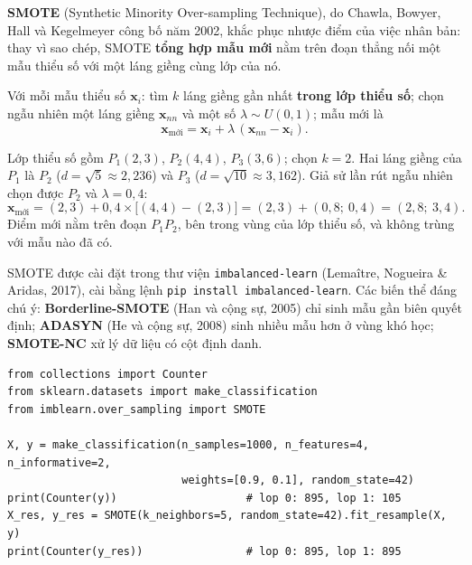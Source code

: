 \textbf{SMOTE} (Synthetic Minority Over-sampling Technique), do Chawla, Bowyer, Hall và Kegelmeyer công bố năm 2002, khắc phục nhược điểm của việc nhân bản: thay vì sao chép, SMOTE \textbf{tổng hợp mẫu mới} nằm trên đoạn thẳng nối một mẫu thiểu số với một láng giềng cùng lớp của nó.

\begin{definition}
Với mỗi mẫu thiểu số $\mathbf{x}_i$: tìm $k$ láng giềng gần nhất \textbf{trong lớp thiểu số}; chọn ngẫu nhiên một láng giềng $\mathbf{x}_{nn}$ và một số $\lambda \sim U(0, 1)$; mẫu mới là
\begin{equation}
    \mathbf{x}_{\text{mới}} = \mathbf{x}_i + \lambda\,(\mathbf{x}_{nn} - \mathbf{x}_i).
\end{equation}
\end{definition}

\begin{example}
Lớp thiểu số gồm $P_1(2, 3)$, $P_2(4, 4)$, $P_3(3, 6)$; chọn $k = 2$. Hai láng giềng của $P_1$ là $P_2$ ($d = \sqrt{5} \approx 2{,}236$) và $P_3$ ($d = \sqrt{10} \approx 3{,}162$). Giả sử lần rút ngẫu nhiên chọn được $P_2$ và $\lambda = 0{,}4$:
\[
    \mathbf{x}_{\text{mới}} = (2, 3) + 0{,}4 \times \big[(4, 4) - (2, 3)\big] = (2, 3) + (0{,}8;\ 0{,}4) = (2{,}8;\ 3{,}4).
\]
Điểm mới nằm trên đoạn $P_1P_2$, bên trong vùng của lớp thiểu số, và không trùng với mẫu nào đã có.
\end{example}


SMOTE được cài đặt trong thư viện \texttt{imbalanced-learn} (Lemaître, Nogueira \& Aridas, 2017), cài bằng lệnh \texttt{pip install imbalanced-learn}. Các biến thể đáng chú ý: \textbf{Borderline-SMOTE} (Han và cộng sự, 2005) chỉ sinh mẫu gần biên quyết định; \textbf{ADASYN} (He và cộng sự, 2008) sinh nhiều mẫu hơn ở vùng khó học; \textbf{SMOTE-NC} xử lý dữ liệu có cột định danh.

\begin{lstlisting}[caption={SMOTE với imbalanced-learn}]
from collections import Counter
from sklearn.datasets import make_classification
from imblearn.over_sampling import SMOTE

X, y = make_classification(n_samples=1000, n_features=4, n_informative=2,
                           weights=[0.9, 0.1], random_state=42)
print(Counter(y))                    # lop 0: 895, lop 1: 105
X_res, y_res = SMOTE(k_neighbors=5, random_state=42).fit_resample(X, y)
print(Counter(y_res))                # lop 0: 895, lop 1: 895
\end{lstlisting}

